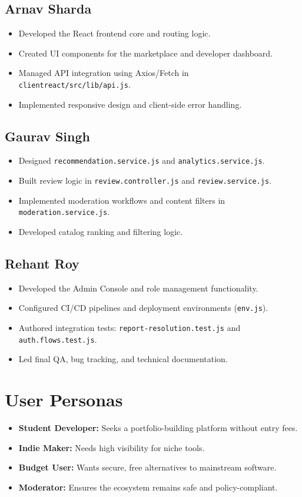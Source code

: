 \documentclass[12pt,a4paper]{article}
\begin{document}
\subsection{Arnav Sharda}
\begin{itemize}
    \item Developed the React frontend core and routing logic.
    \item Created UI components for the marketplace and developer dashboard.
    \item Managed API integration using Axios/Fetch in \texttt{clientreact/src/lib/api.js}.
    \item Implemented responsive design and client-side error handling.
\end{itemize}

\subsection{Gaurav Singh}
\begin{itemize}
    \item Designed \texttt{recommendation.service.js} and \texttt{analytics.service.js}.
    \item Built review logic in \texttt{review.controller.js} and \texttt{review.service.js}.
    \item Implemented moderation workflows and content filters in \texttt{moderation.service.js}.
    \item Developed catalog ranking and filtering logic.
\end{itemize}

\subsection{Rehant Roy}
\begin{itemize}
    \item Developed the Admin Console and role management functionality.
    \item Configured CI/CD pipelines and deployment environments (\texttt{env.js}).
    \item Authored integration tests: \texttt{report-resolution.test.js} and \texttt{auth.flows.test.js}.
    \item Led final QA, bug tracking, and technical documentation.
\end{itemize}

\section{User Personas}
\begin{itemize}
    \item \textbf{Student Developer:} Seeks a portfolio-building platform without entry fees.
    \item \textbf{Indie Maker:} Needs high visibility for niche tools.
    \item \textbf{Budget User:} Wants secure, free alternatives to mainstream software.
    \item \textbf{Moderator:} Ensures the ecosystem remains safe and policy-compliant.
\end{itemize}
\end{document}
